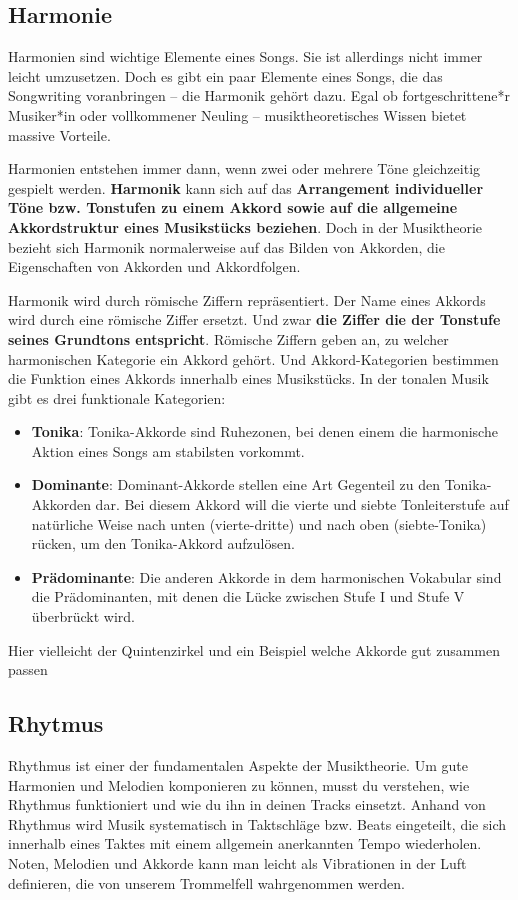 \subsection{Harmonie}
Harmonien sind wichtige Elemente eines Songs. Sie ist allerdings nicht immer leicht umzusetzen. 
Doch es gibt ein paar Elemente eines Songs, die das Songwriting voranbringen – die Harmonik gehört dazu. 
Egal ob fortgeschrittene*r Musiker*in oder vollkommener Neuling – musiktheoretisches Wissen bietet massive Vorteile.

Harmonien entstehen immer dann, wenn zwei oder mehrere Töne gleichzeitig gespielt werden. \textbf{Harmonik} kann 
sich auf das \textbf{Arrangement individueller Töne bzw. Tonstufen zu einem Akkord sowie auf die allgemeine Akkordstruktur 
eines Musikstücks beziehen}. Doch in der Musiktheorie bezieht sich Harmonik normalerweise auf das Bilden 
von Akkorden, die Eigenschaften von Akkorden und Akkordfolgen.

Harmonik wird durch römische Ziffern repräsentiert. Der Name eines Akkords wird durch eine römische Ziffer
ersetzt. Und zwar \textbf{die Ziffer die der Tonstufe seines Grundtons entspricht}. Römische Ziffern geben an, 
zu welcher harmonischen Kategorie ein Akkord gehört. Und Akkord-Kategorien bestimmen die Funktion eines 
Akkords innerhalb eines Musikstücks. In der tonalen Musik gibt es drei funktionale Kategorien:

\begin{itemize}
    \item \textbf{Tonika}: Tonika-Akkorde sind Ruhezonen, bei denen einem die harmonische Aktion eines 
    Songs am stabilsten vorkommt.
    \item \textbf{Dominante}: Dominant-Akkorde stellen eine Art Gegenteil zu den Tonika-Akkorden dar. 
    Bei diesem Akkord will die vierte und siebte Tonleiterstufe auf natürliche Weise nach unten 
    (vierte-dritte) und nach oben (siebte-Tonika) rücken, um den Tonika-Akkord aufzulösen.
    \item \textbf{Prädominante}: Die anderen Akkorde in dem harmonischen Vokabular sind die Prädominanten, 
    mit denen die Lücke zwischen Stufe I und Stufe V überbrückt wird.
\end{itemize}

Hier vielleicht der Quintenzirkel und ein Beispiel welche Akkorde gut zusammen passen

\subsection{Rhytmus}
Rhythmus ist einer der fundamentalen Aspekte der Musiktheorie. Um gute Harmonien und Melodien komponieren zu können, musst du verstehen, wie Rhythmus funktioniert und wie du ihn in deinen Tracks einsetzt. Anhand von Rhythmus wird Musik systematisch in Taktschläge bzw. Beats eingeteilt, die sich innerhalb eines Taktes mit einem allgemein anerkannten Tempo wiederholen. Noten, Melodien und Akkorde kann man leicht als Vibrationen in der Luft definieren, die von unserem Trommelfell wahrgenommen werden.

